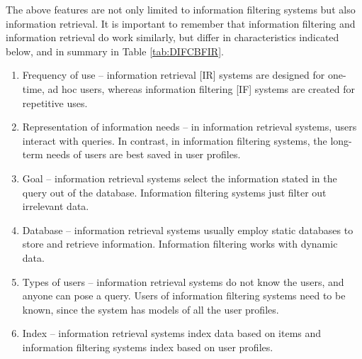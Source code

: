 The above features are not only limited to information filtering systems but also information retrieval. It is important to remember that information filtering and information retrieval do work similarly, but differ in characteristics indicated below, and in summary in Table \ref{tab:DIFCBFIR}.

\begin{enumerate}
    \item Frequency of use – information retrieval [IR] systems are designed for one-time, ad hoc users, whereas information filtering [IF] systems are created for repetitive uses.
    \item Representation of information needs – in information retrieval systems, users interact with queries. In contrast, in information filtering systems, the long-term needs of users are best saved in user profiles.
    \item Goal – information retrieval systems select the information stated in the query out of the database. Information filtering systems just filter out irrelevant data.
    \item Database – information retrieval systems usually employ static databases to store and retrieve information. Information filtering works with dynamic data.
    \item Types of users – information retrieval systems do not know the users, and anyone can pose a query. Users of information filtering systems need to be known, since the system has models of all the user profiles.
    \item Index – information retrieval systems index data based on items and information filtering systems index based on user profiles.
\end{enumerate}

